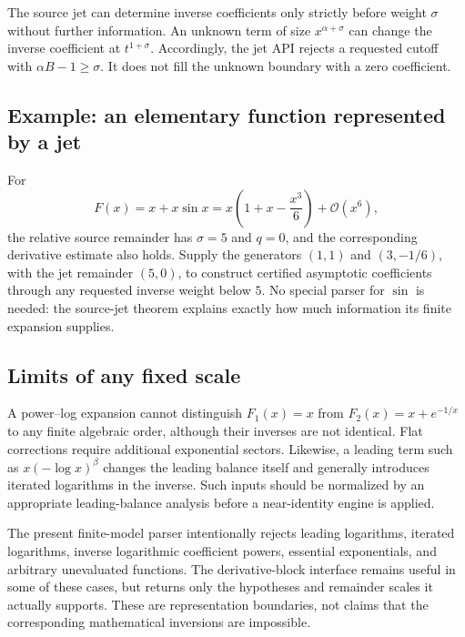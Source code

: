 \documentclass[11pt,a4paper]{article}
\numberwithin{equation}{section}
\theoremstyle{definition}\newtheorem{definition}[theorem]{Definition}
\theoremstyle{remark}\newtheorem{remark}[theorem]{Remark}
\newcommand{\OO}{\mathcal O}\newcommand{\Id}{\mathrm{id}}
\begin{document}
The source jet can determine inverse coefficients only strictly before weight $\sigma$ without further information. An unknown term of size $x^{\alpha+\sigma}$ can change the inverse coefficient at $t^{1+\sigma}$. Accordingly, the jet API rejects a requested cutoff with $\alpha B-1\ge\sigma$. It does not fill the unknown boundary with a zero coefficient.

\subsection{Example: an elementary function represented by a jet}
For
\[
F(x)=x+x\sin x
=x\left(1+x-\frac{x^3}{6}\right)+\OO(x^6),
\]
the relative source remainder has $\sigma=5$ and $q=0$, and the corresponding derivative estimate also holds. Supply the generators $(1,1)$ and $(3,-1/6)$, with the jet remainder $(5,0)$, to construct certified asymptotic coefficients through any requested inverse weight below $5$. No special parser for $\sin$ is needed: the source-jet theorem explains exactly how much information its finite expansion supplies.

\subsection{Limits of any fixed scale}
A power--log expansion cannot distinguish $F_1(x)=x$ from $F_2(x)=x+e^{-1/x}$ to any finite algebraic order, although their inverses are not identical. Flat corrections require additional exponential sectors. Likewise, a leading term such as $x(-\log x)^\beta$ changes the leading balance itself and generally introduces iterated logarithms in the inverse. Such inputs should be normalized by an appropriate leading-balance analysis before a near-identity engine is applied.

The present finite-model parser intentionally rejects leading logarithms, iterated logarithms, inverse logarithmic coefficient powers, essential exponentials, and arbitrary unevaluated functions. The derivative-block interface remains useful in some of these cases, but returns only the hypotheses and remainder scales it actually supports. These are representation boundaries, not claims that the corresponding mathematical inversions are impossible.
\end{document}
